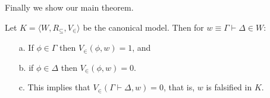 \documentclass{article}
\begin{document}
\noindent
Finally we show our main theorem.  
\begin{thm}[Falsification in $K$]
  \label{thm:falsification_in_k}
  Let $K = \langle W, R_\subseteq, V_\in \rangle$ be the canonical model. Then for $w \equiv \Gamma \vdash \Delta \in W$:
  \begin{center}
    \begin{itemize}
    \item[a.] If $\phi \in \Gamma$ then $V_\in(\phi, w) = 1$, and
    \item[b.] if $\phi \in \Delta$ then $V_\in(\phi,w) = 0$.
    \item[c.] This implies that $V_\in(\Gamma \vdash \Delta, w) = 0$, that is, $w$ is 
      falsified in $K$.
    \end{itemize}
  \end{center}  
\end{thm}
\end{document}
